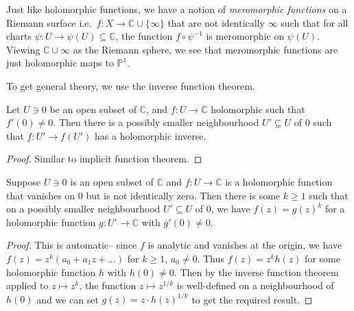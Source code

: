 \begin{example}
    Just like holomorphic functions, we have a notion of \textit{meromorphic
    functions} on a Riemann surface i.e.\ \(f:X\to \mathbb{C}\cup \{\infty\}\)
    that are not identically \(\infty\) such that for all charts \(\psi:U\to
    \psi(U)\subseteq \mathbb{C}\),  the function \(f\circ \psi^{-1}\) is
    meromorphic on \(\psi(U)\). Viewing \(\mathbb{C}\cup \infty\) as the Riemann
    sphere, we see that meromorphic functions are just
    holomorphic maps to \(\mathbb{P}^1\).
\end{example}

To get general theory, we use the inverse function theorem.

\begin{theorem}
    Let \(U\ni 0\) be an open subset of \(\mathbb{C}\), and \(f:U\to
    \mathbb{C}\) holomorphic such that \(f'(0)\neq 0\). Then there is a possibly
    smaller neighbourhood \(U'\subseteq U\) of \(0\) such that \(f:U'\to
    f(U')\) has a holomorphic inverse.

    \begin{proof}
        Similar to implicit function theorem.
    \end{proof}
\end{theorem}

\begin{corollary}
    Suppose \(U\ni 0\) is an open subset of \(\mathbb{C}\) and \(f:U\to
    \mathbb{C}\) is a holomorphic function that vanishes on \(0\) but is not
    identically zero. Then there is some \(k\geq 1\) such that on a possibly
    smaller neighbourhood \(U'\subseteq U\) of \(0\), we have \(f(z)=g(z)^k\)
    for a holomorphic function \(g:U'\to \mathbb{C}\) with \(g'(0)\neq 0\).

    \begin{proof}
        This is automatic-- since \(f\) is analytic and vanishes at the origin,
        we have \(f(z)=z^k(a_0+a_1z+\ldots)\) for \(k\geq 1\), \(a_0\neq 0\).
        Thus \(f(z)=z^kh(z)\) for some holomorphic function \(h\) with
        \(h(0)\neq 0\). Then by the inverse function theorem applied to
        \(z\mapsto z^k\), the function \(z\mapsto z^{1/k}\) is well-defined on a
        neighbourhood of \(h(0)\) and we can set \(g(z)=z
        \cdot h(z)^{1/k}\) to get the required result.
    \end{proof}
\end{corollary}

